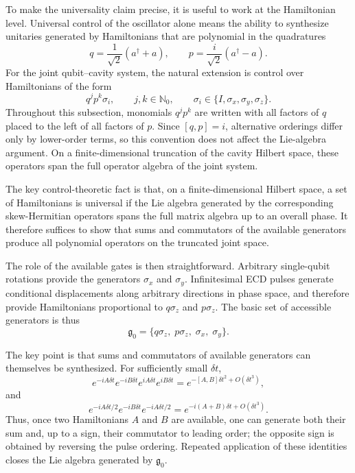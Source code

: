 To make the universality claim precise, it is useful to work at the Hamiltonian level. Universal control of the oscillator alone means the ability to synthesize unitaries generated by Hamiltonians that are polynomial in the quadratures \cite{eickbusch2022ecd,braunstein2005}
\begin{equation}
    q = \frac{1}{\sqrt{2}}(a^\dagger+a),
    \qquad
    p = \frac{i}{\sqrt{2}}(a^\dagger-a).
\end{equation}
For the joint qubit--cavity system, the natural extension is control over Hamiltonians of the form
\begin{equation}
    q^j p^k \sigma_i,
    \qquad
    j,k \in \mathbb{N}_0,
    \qquad
    \sigma_i \in \{I,\sigma_x,\sigma_y,\sigma_z\}.
\end{equation}
Throughout this subsection, monomials \(q^j p^k\) are written with all factors of \(q\) placed to the left of all factors of \(p\). Since \([q,p]=i\), alternative orderings differ only by lower-order terms, so this convention does not affect the Lie-algebra argument. On a finite-dimensional truncation of the cavity Hilbert space, these operators span the full operator algebra of the joint system.

The key control-theoretic fact is that, on a finite-dimensional Hilbert space, a set of Hamiltonians is universal if the Lie algebra generated by the corresponding skew-Hermitian operators spans the full matrix algebra up to an overall phase. It therefore suffices to show that sums and commutators of the available generators produce all polynomial operators on the truncated joint space.

The role of the available gates is then straightforward. Arbitrary single-qubit rotations provide the generators \(\sigma_x\) and \(\sigma_y\). Infinitesimal ECD pulses generate conditional displacements along arbitrary directions in phase space, and therefore provide Hamiltonians proportional to \(q\sigma_z\) and \(p\sigma_z\). The basic set of accessible generators is thus
\begin{equation}
    \mathfrak{g}_0
    =
    \{q\sigma_z,\; p\sigma_z,\; \sigma_x,\; \sigma_y\}.
\end{equation}

The key point is that sums and commutators of available generators can themselves be synthesized. For sufficiently small \(\delta t\),
\begin{equation}
    e^{-iA\delta t}e^{-iB\delta t}e^{iA\delta t}e^{iB\delta t}
    =
    e^{-[A,B]\delta t^2 + O(\delta t^3)},
\end{equation}
and
\begin{equation}
    e^{-iA\delta t/2}e^{-iB\delta t}e^{-iA\delta t/2}
    =
    e^{-i(A+B)\delta t + O(\delta t^3)}.
\end{equation}
Thus, once two Hamiltonians \(A\) and \(B\) are available, one can generate both their sum and, up to a sign, their commutator to leading order; the opposite sign is obtained by reversing the pulse ordering. Repeated application of these identities closes the Lie algebra generated by \(\mathfrak{g}_0\).

